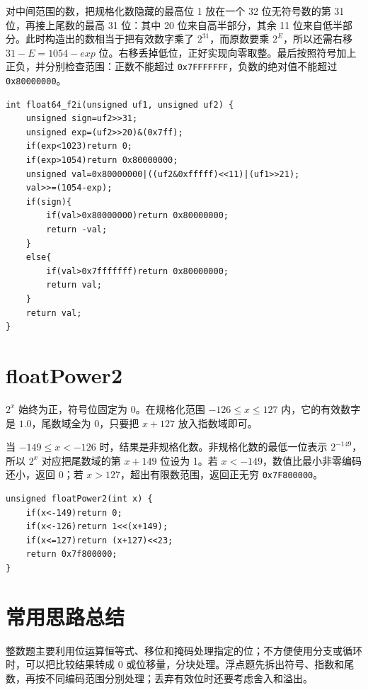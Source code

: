 \documentclass[12pt,a4paper]{ctexart}
\begin{document}
对中间范围的数，把规格化数隐藏的最高位 1 放在一个 32 位无符号数的第 31 位，再接上尾数的最高 31 位：其中 20 位来自高半部分，其余 11 位来自低半部分。此时构造出的数相当于把有效数字乘了 $2^{31}$，而原数要乘 $2^E$，所以还需右移 $31-E=1054-exp$ 位。右移丢掉低位，正好实现向零取整。最后按照符号加上正负，并分别检查范围：正数不能超过 \texttt{0x7FFFFFFF}，负数的绝对值不能超过 \texttt{0x80000000}。

\begin{lstlisting}
int float64_f2i(unsigned uf1, unsigned uf2) {
    unsigned sign=uf2>>31;
    unsigned exp=(uf2>>20)&(0x7ff);
    if(exp<1023)return 0;
    if(exp>1054)return 0x80000000;
    unsigned val=0x80000000|((uf2&0xfffff)<<11)|(uf1>>21);
    val>>=(1054-exp);
    if(sign){
        if(val>0x80000000)return 0x80000000;
        return -val;
    }
    else{
        if(val>0x7fffffff)return 0x80000000;
        return val;
    }
    return val;
}
\end{lstlisting}

\section{floatPower2}
$2^x$ 始终为正，符号位固定为 0。在规格化范围 $-126\leq x\leq127$ 内，它的有效数字是 $1.0$，尾数域全为 0，只要把 $x+127$ 放入指数域即可。

当 $-149\leq x<-126$ 时，结果是非规格化数。非规格化数的最低一位表示 $2^{-149}$，所以 $2^x$ 对应把尾数域的第 $x+149$ 位设为 1。若 $x<-149$，数值比最小非零编码还小，返回 0；若 $x>127$，超出有限数范围，返回正无穷 \texttt{0x7F800000}。

\begin{lstlisting}
unsigned floatPower2(int x) {
    if(x<-149)return 0;
    if(x<-126)return 1<<(x+149);
    if(x<=127)return (x+127)<<23;
    return 0x7f800000;
}
\end{lstlisting}

\section*{常用思路总结}

整数题主要利用位运算恒等式、移位和掩码处理指定的位；不方便使用分支或循环时，可以把比较结果转成 0 或位移量，分块处理。浮点题先拆出符号、指数和尾数，再按不同编码范围分别处理；丢弃有效位时还要考虑舍入和溢出。
\end{document}
